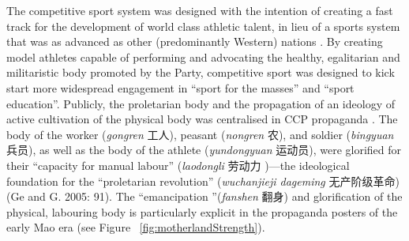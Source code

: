 \begin{CJK}{UTF8}{gbsn}
The competitive sport system was designed with the intention of creating a fast track for the development of world class athletic talent, in lieu of a sports system that was as advanced as other (predominantly Western) nations \citep[whose development pathways for athletes were more organically embedded within existing social and educational institutions; see][]{Brownell2008}.  By creating model athletes capable of performing and advocating the healthy, egalitarian and militaristic body promoted by the Party, competitive sport was designed to kick start more widespread engagement in ``sport for the masses'' and ``sport education''\citep[56]{Brownell1995}.  Publicly, the proletarian body and the propagation of an ideology of active cultivation of the physical body was centralised in CCP propaganda \citep[58]{Brownell1995}.  The body of the worker (\textit{gongren} 工人), peasant (\textit{nongren} 农), and soldier (\textit{bingyuan} 兵员), as well as the body of the athlete (\textit{yundongyuan} 运动员), were glorified for their ``capacity for manual labour'' (\textit{laodongli} 劳动力 )---the ideological foundation for the ``proletarian revolution'' (\textit{wuchanjieji dageming} 无产阶级革命) (Ge and G. 2005: 91).  The ``emancipation ''(\textit{fanshen} 翻身) and glorification of the physical, labouring body is particularly explicit in the propaganda posters of the early Mao era \citep[87]{Ge2005} (see Figure ~\ref{fig:motherlandStrength}).


\end{CJK}
